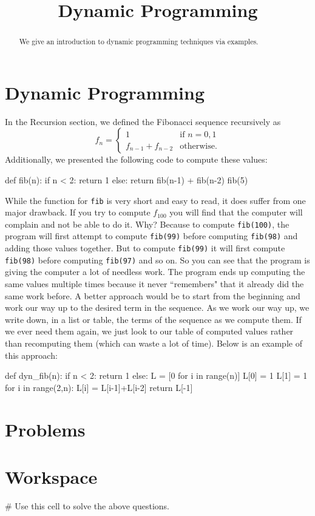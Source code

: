 \documentclass{ximera}
\title{Dynamic Programming}
\begin{document}
  
\begin{abstract}  
We give an introduction to dynamic programming techniques via examples.
\end{abstract}  
\maketitle

\section{Dynamic Programming}

In the Recursion section, we defined the Fibonacci sequence recursively as $$f_n=\begin{cases} 1 & \text{if $n=0,1$}\\ f_{n-1}+f_{n-2} & \text{otherwise.}\end{cases}$$ Additionally, we presented the following code to compute these values:
\begin{sageCell}
def fib(n):
        if n < 2:
                return 1
        else:
                return fib(n-1) + fib(n-2)			
fib(5)
\end{sageCell}
While the function for \verb|fib| is very short and easy to read, it does suffer from one major drawback. If you try to compute $f_{100}$ you will find that the computer will complain and not be able to do it. Why? Because to compute \verb|fib(100)|, the program will first attempt to compute \verb|fib(99)| before computing \verb|fib(98)| and adding those values together. But to compute \verb|fib(99)| it will first compute \verb|fib(98)| before computing \verb|fib(97)| and so on. So you can see that the program is giving the computer a lot of needless work. The program ends up computing the same values multiple times because it never ``remembers" that it already did the same work before. A better approach would be to start from the beginning and work our way up to the desired term in the sequence. As we work our way up, we write down, in a list or table, the terms of the sequence as we compute them. If we ever need them again, we just look to our table of computed values rather than recomputing them (which can waste a lot of time). Below is an example of this approach:
\begin{sageCell}
def dyn_fib(n):
        if n < 2:
                return 1
        else:
                L = [0 for i in range(n)]
                L[0] = 1
                L[1] = 1
                for i in range(2,n):
                        L[i] = L[i-1]+L[i-2]
                return L[-1]
\end{sageCell}



\section{Problems}

\begin{question}
\end{question}

\section{Workspace}

\begin{sageCell}
# Use this cell to solve the above questions.
\end{sageCell}
\end{document}
